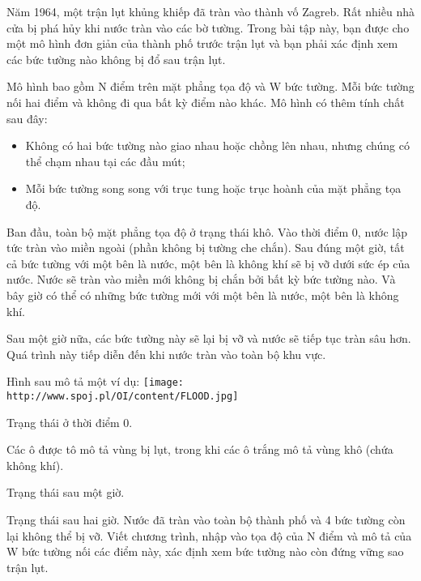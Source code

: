 Năm 1964, một trận lụt khủng khiếp đã tràn vào thành vố Zagreb. Rất nhiều nhà cửa bị phá hủy khi nước tràn vào các bờ tường. Trong bài tập này, bạn được cho một mô hình đơn giản của thành phố trước trận lụt và bạn phải xác định xem các bức tường nào không bị đổ sau trận lụt.  

   Mô hình bao gồm N điểm trên mặt phẳng tọa độ và W bức tường. Mỗi bức tường nối hai điểm và không đi qua bất kỳ điểm nào khác. Mô hình có thêm tính chất sau đây:  
\begin{itemize}
	\item     Không có hai bức tường nào giao nhau hoặc chồng lên nhau, nhưng chúng có thể chạm nhau tại các đầu mút;   
	\item     Mỗi bức tường song song với trục tung hoặc trục hoành của mặt phẳng tọa độ.   
\end{itemize}

   Ban đầu, toàn bộ mặt phẳng tọa độ ở trạng thái khô. Vào thời điểm 0, nước lập tức tràn vào miền ngoài (phần không bị tường che chắn). Sau đúng một giờ, tất cả bức tường với một bên là nước, một bên là không khí sẽ bị vỡ dưới sức ép của nước. Nước sẽ tràn vào miền mới không bị chắn bởi bất kỳ bức tường nào. Và bây giờ có thể có những bức tường mới với một bên là nước, một bên là không khí.  

   Sau một giờ nữa, các bức tường này sẽ lại bị vỡ và nước sẽ tiếp tục tràn sâu hơn. Quá trình này tiếp diễn đến khi nước tràn vào toàn bộ khu vực.  

   Hình sau mô tả một ví dụ:  
\texttt{[image: http://www.spoj.pl/OI/content/FLOOD.jpg]}

   Trạng thái ở thời điểm 0.  

   Các ô được tô mô tả vùng bị lụt, trong khi các ô trắng mô tả vùng khô (chứa không khí).  

   Trạng thái sau một giờ.  

   Trạng thái sau hai giờ. Nước đã tràn vào toàn bộ thành phố và 4 bức tường còn lại không thể bị vỡ.
Viết chương trình, nhập vào tọa độ của N điểm và mô tả của W bức tường nối các điểm này, xác định xem bức tường nào còn đứng vững sao trận lụt.